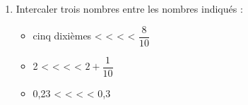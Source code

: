 \begin{changemargin}{-10mm}{-10mm}
\begin{activite}
\begin{enumerate}
            \vspace*{-3mm}
             \item Intercaler trois nombres entre les nombres indiqués : 
             \begin{spacing}{1}
                \begin{itemize}
                    \item cinq dixièmes <\makebox[0.2\linewidth]{\dotfill} < \makebox[0.2\linewidth]{\dotfill} < \makebox[0.2\linewidth]{\dotfill} < $\dfrac{8}{10}$\\
                    \item 2             <\makebox[0.2\linewidth]{\dotfill} < \makebox[0.2\linewidth]{\dotfill} < \makebox[0.2\linewidth]{\dotfill} < $2+\dfrac{1}{10}$\\
                    \item 0,23          <\makebox[0.2\linewidth]{\dotfill} < \makebox[0.2\linewidth]{\dotfill} < \makebox[0.2\linewidth]{\dotfill} < 0,3
                \end{itemize}
            \end{spacing}
            \vspace*{-50mm}
          \end{enumerate}
 \end{activite} 
\end{changemargin}